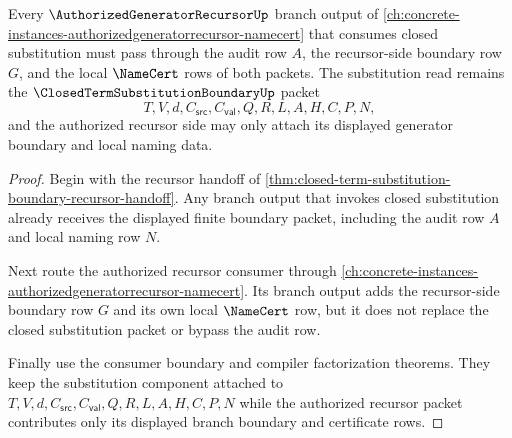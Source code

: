 \begin{theorem}
\label{thm:closed-term-substitution-boundary-recursor-audit-route}
Every $\AuthorizedGeneratorRecursorUp$ branch output of \autoref{ch:concrete-instances-authorizedgeneratorrecursor-namecert} that consumes closed substitution must pass through the audit row $A$, the recursor-side boundary row $G$, and the local $\NameCert$ rows of both packets. The substitution read remains the $\ClosedTermSubstitutionBoundaryUp$ packet
$$
T,V,d,C_{\mathsf{src}},C_{\mathsf{val}},Q,R,L,A,H,C,P,N,
$$
and the authorized recursor side may only attach its displayed generator boundary and local naming data.
\end{theorem}
\begin{proof}
Begin with the recursor handoff of \autoref{thm:closed-term-substitution-boundary-recursor-handoff}. Any branch output that invokes closed substitution already receives the displayed finite boundary packet, including the audit row $A$ and local naming row $N$.

Next route the authorized recursor consumer through \autoref{ch:concrete-instances-authorizedgeneratorrecursor-namecert}. Its branch output adds the recursor-side boundary row $G$ and its own local $\NameCert$ row, but it does not replace the closed substitution packet or bypass the audit row.

Finally use the consumer boundary and compiler factorization theorems. They keep the substitution component attached to $T,V,d,C_{\mathsf{src}},C_{\mathsf{val}},Q,R,L,A,H,C,P,N$ while the authorized recursor packet contributes only its displayed branch boundary and certificate rows.
\end{proof}

